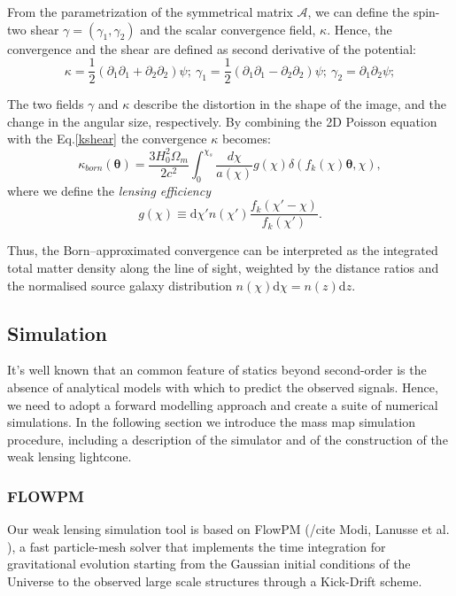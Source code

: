 \documentclass[twocolumn,twocolappendix]{aastex63}
\begin{document}
From the parametrization of the symmetrical matrix $\mathcal{A}$, we can define the spin-two shear $\gamma=(\gamma_1,\gamma_2)$ and the scalar convergence field, $\kappa$. 
Hence, the convergence and the shear are defined as second derivative of the potential:
\begin{equation}\label{kshear}
    \kappa=\frac{1}{2}(\partial_1\partial_1+\partial_2\partial_2)\psi; \ \gamma_1=\frac{1}{2}(\partial_1\partial_1-\partial_2\partial_2)\psi; \ 
    \gamma_2=\partial_1\partial_2\psi;
\end{equation}

The two fields $\gamma$ and $\kappa$ describe the distortion in the shape of the image, and the change in the angular size, respectively.
By combining the 2D Poisson equation with the Eq.\ref{kshear} the convergence $\kappa$ becomes:
\begin{equation}
    \kappa_{born}(\boldsymbol{\theta})= \frac{3H_0^2 \Omega_m}{2c^2}
    \int_0^{\chi_s} 
    \frac{d\chi}{a(\chi)}
    g(\chi)
    \delta(f_k(\chi)\boldsymbol{\theta},\chi),
\end{equation}
where we define the \textit{lensing efficiency}
\begin{equation}
   g(\chi) \equiv
   \text{d}\chi'
   n(\chi')
    \frac{f_k(\chi'-\chi)}{f_k(\chi')}.
\end{equation}


Thus, the Born–approximated convergence can be interpreted as the integrated total matter density along the line of sight, weighted by the distance ratios and the normalised source galaxy  distribution $n(\chi)$d$\chi=n(z)$d$z$.


\subsection{Simulation}
It's well known that an common feature of statics beyond second-order is the absence of analytical models with which to predict the observed signals. Hence, we need to adopt a forward modelling approach and create a suite of numerical simulations. 
In the following section we introduce the mass map simulation procedure, including a description of the simulator and of the construction of the weak lensing lightcone.

\subsubsection{FLOWPM}
Our weak lensing simulation tool is based on FlowPM (/cite Modi, Lanusse et al. ), a fast particle-mesh solver that implements the time integration for gravitational evolution starting from the Gaussian initial conditions of the Universe to the observed large scale structures through a Kick-Drift scheme.
\end{document}
